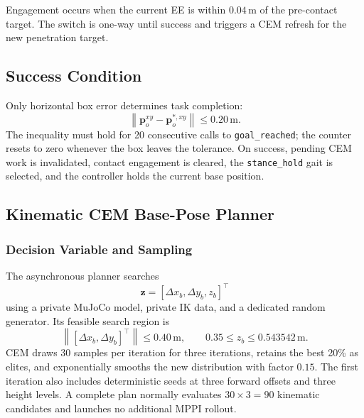 \documentclass[11pt,a4paper]{article}
\newcommand{\norm}[1]{\left\lVert #1 \right\rVert}
\newcommand{\code}[1]{\texttt{#1}}
\begin{document}
Engagement occurs when the current EE is within $0.04\,\mathrm{m}$ of the
pre-contact target. The switch is one-way until success and triggers a CEM
refresh for the new penetration target.

\subsection{Success Condition}

Only horizontal box error determines task completion:
\begin{equation}
  \norm{\bm{p}_o^{xy}-\bm{p}_o^{*,xy}}
  \leq0.20\,\mathrm{m}.
\end{equation}
The inequality must hold for 20 consecutive calls to \code{goal\_reached};
the counter resets to zero whenever the box leaves the tolerance. On success,
pending CEM work is invalidated, contact engagement is cleared, the
\code{stance\_hold} gait is selected, and the controller holds the current
base position.

\subsection{Kinematic CEM Base-Pose Planner}

\subsubsection{Decision Variable and Sampling}

The asynchronous planner searches
\begin{equation}
  \bm{z}=
  [\Delta x_b,\Delta y_b,z_b]^\top
\end{equation}
using a private MuJoCo model, private IK data, and a dedicated random
generator. Its feasible search region is
\begin{equation}
  \norm{[\Delta x_b,\Delta y_b]^\top}\leq0.40\,\mathrm{m},
  \qquad
  0.35\leq z_b\leq0.543542\,\mathrm{m}.
\end{equation}
CEM draws 30 samples per iteration for three iterations, retains the best
20\% as elites, and exponentially smooths the new distribution with factor
$0.15$. The first iteration also includes deterministic seeds at three
forward offsets and three height levels. A complete plan normally evaluates
$30\times3=90$ kinematic candidates and launches no additional MPPI rollout.
\end{document}
